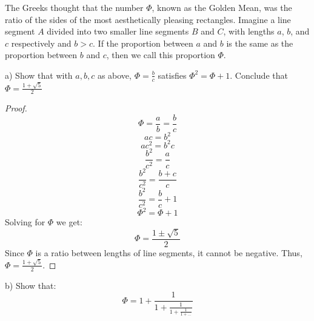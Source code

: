 \documentclass{article}
\begin{document}
\begin{tcolorbox}
The Greeks thought that the number $\Phi$, known as the Golden Mean, was the ratio of the sides
of the most aesthetically pleasing rectangles.
Imagine a line segment $A$ divided into two smaller line segments $B$ and $C$, with lengths $a$, $b$,
and $c$ respectively and $b > c$. If the proportion between $a$ and $b$ is the same as the proportion
between $b$ and $c$, then we call this proportion $\Phi$.

a) Show that with $a, b, c$ as above, $\Phi = \frac{b}{c}$ satisfies $\Phi^2 = \Phi + 1$. Conclude that $\Phi = \frac{1+\sqrt{5}}{2}$
\end{tcolorbox}

\begin{proof}
$$ \Phi = \frac{a}{b} = \frac{b}{c} $$
$$ ac=b^2 $$
$$ ac^2 = b^2 c $$
$$ \frac{b^2}{c^2} = \frac{a}{c} $$
$$ \frac{b^2}{c^2} = \frac{b+c}{c} $$
$$ \frac{b^2}{c^2} = \frac{b}{c} + 1 $$
$$ \Phi^2 = \Phi + 1 $$
Solving for $\Phi$ we get:
$$ \Phi = \frac{1 \pm \sqrt{5}}{2} $$
Since $\Phi$ is a ratio between lengths of line segments, it cannot be negative. Thus, $\Phi = \frac{1 + \sqrt{5}}{2}$.
\end{proof}


\begin{tcolorbox}
b) Show that:
$$ \Phi = 1+\frac{1}{1+\frac{1}{1+\frac{1}{1+\dots}}}$$
\end{tcolorbox}
\end{document}
